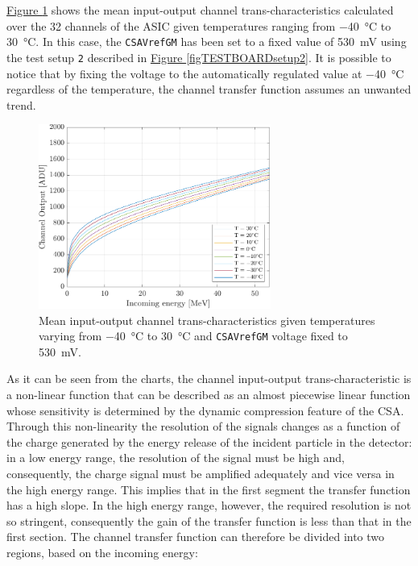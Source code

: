 \hyperref[figFDTplot530mV]{Figure \ref{figFDTplot530mV}} shows the mean input-output channel trans-characteristics calculated over the 32 channels of the ASIC given temperatures ranging from \SI{-40}{\celsius} to \SI{30}{\celsius}. In this case, the \texttt{CSAVrefGM} has been set to a fixed value of \SI{530}{\milli\volt} using the test setup \texttt{2} described in \hyperref[figTESTBOARDsetup2]{Figure \ref{figTESTBOARDsetup2}}. It is possible to notice that by fixing the voltage to the automatically regulated value at \SI{-40}{\celsius} regardless of the temperature, the channel transfer function assumes an unwanted trend.  

\begin{figure}[h!]
    \centering
    \includegraphics[width=0.68\textwidth]{Images/chap1/results/FDT/fdt_csavrefgm_530mV_tau6_keV.pdf}
    \caption{Mean input-output channel trans-characteristics given temperatures varying from \SI{-40}{\celsius} to \SI{30}{\celsius} and \texttt{CSAVrefGM} voltage fixed to \SI{530}{\milli\volt}.}
    \label{figFDTplot530mV}
\end{figure}

\par
As it can be seen from the charts, the channel input-output trans-characteristic is a non-linear function that can be described as an almost piecewise linear function whose sensitivity is determined by the dynamic compression feature of the CSA. Through this non-linearity the resolution of the signals changes as a function of the charge generated by the energy release of the incident particle in the detector: in a low energy range, the resolution of the signal must be high and, consequently, the charge signal must be amplified adequately and vice versa in the high energy range. This implies that in the first segment the transfer function has a high slope. In the high energy range, however, the required resolution is not so stringent, consequently the gain of the transfer function is less than that in the first section. The channel transfer function can therefore be divided into two regions, based on the incoming energy:

